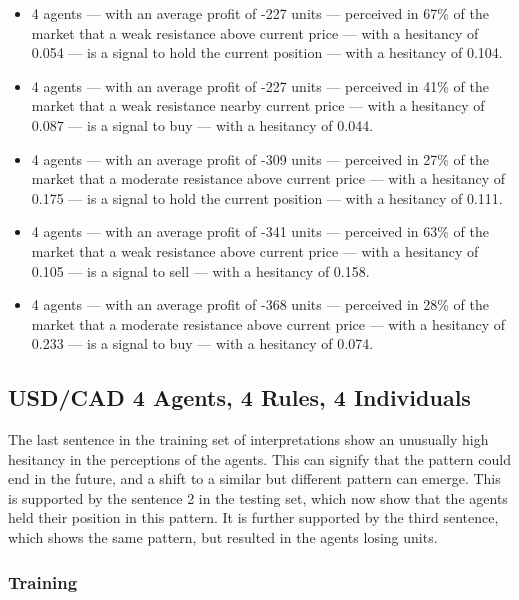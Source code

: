 {\small
  \begin{itemize}
  \item 4 agents — with an average profit of -227 units — perceived in 67\% of
    the market that a weak resistance above current price — with a hesitancy of
    0.054 — is a signal to hold the current position — with a hesitancy of
    0.104.
  \item 4 agents — with an average profit of -227 units — perceived in 41\% of
    the market that a weak resistance nearby current price — with a hesitancy of
    0.087 — is a signal to buy — with a hesitancy of 0.044.
  \item 4 agents — with an average profit of -309 units — perceived in 27\% of
    the market that a moderate resistance above current price — with a hesitancy
    of 0.175 — is a signal to hold the current position — with a hesitancy of
    0.111.
  \item 4 agents — with an average profit of -341 units — perceived in 63\% of
    the market that a weak resistance above current price — with a hesitancy of
    0.105 — is a signal to sell — with a hesitancy of 0.158.
  \item 4 agents — with an average profit of -368 units — perceived in 28\% of
    the market that a moderate resistance above current price — with a hesitancy
    of 0.233 — is a signal to buy — with a hesitancy of 0.074.
  \end{itemize}
}





\subsection{USD/CAD 4 Agents, 4 Rules, 4 Individuals}
\label{}

The last sentence in the training set of interpretations show an unusually high
hesitancy in the perceptions of the agents. This can signify that the pattern
could end in the future, and a shift to a similar but different pattern can
emerge. This is supported by the sentence 2 in the testing set, which now show
that the agents held their position in this pattern. It is further supported by
the third sentence, which shows the same pattern, but resulted in the agents
losing units.

\subsubsection{Training}
\label{}

